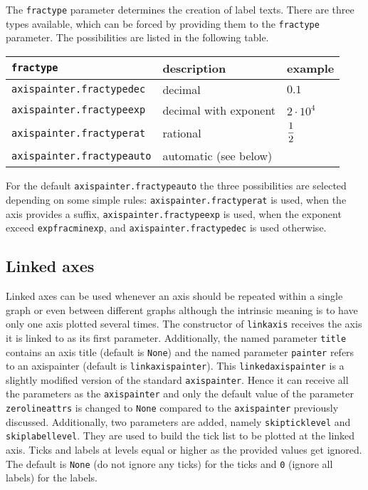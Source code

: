 The \verb|fractype| parameter determines the creation of label texts.
There are three types available, which can be forced by providing them
to the \verb|fractype| parameter. The possibilities are listed in the
following table.

\begin{center}
\begin{tabular}{lll}
\texttt{fractype}&description&example\\
\hline
\texttt{axispainter.fractypedec}&decimal&$0.1$\\
\texttt{axispainter.fractypeexp}&decimal with exponent&$2\cdot 10^4$\\
\texttt{axispainter.fractyperat}&rational&$\displaystyle{{1}\over{2}}$\\
\texttt{axispainter.fractypeauto}&automatic (see below)&\\
\end{tabular}
\end{center}

For the default \verb|axispainter.fractypeauto| the three
possibilities are selected depending on some simple rules:
\verb|axispainter.fractyperat| is used, when the axis provides a
suffix, \verb|axispainter.fractypeexp| is used, when the exponent
exceed \verb|expfracminexp|, and \verb|axispainter.fractypedec| is
used otherwise.

\subsection{Linked axes}

Linked axes can be used whenever an axis should be repeated within a
single graph or even between different graphs although the intrinsic
meaning is to have only one axis plotted several times. The
constructor of \verb|linkaxis| receives the axis it is linked to as
its first parameter. Additionally, the named parameter \verb|title|
contains an axis title (default is \verb|None|) and the named
parameter \verb|painter| refers to an axispainter (default is
\verb|linkaxispainter|). This \verb|linkedaxispainter| is a slightly
modified version of the standard \verb|axispainter|. Hence it can
receive all the parameters as the \verb|axispainter| and only the
default value of the parameter \verb|zerolineattrs| is changed to
\verb|None| compared to the \verb|axispainter| previously discussed.
Additionally, two parameters are added, namely \verb|skipticklevel|
and \verb|skiplabellevel|. They are used to build the tick list to be
plotted at the linked axis. Ticks and labels at levels equal or higher
as the provided values get ignored. The default is \verb|None| (do not
ignore any ticks) for the ticks and \verb|0| (ignore all labels) for
the labels.

